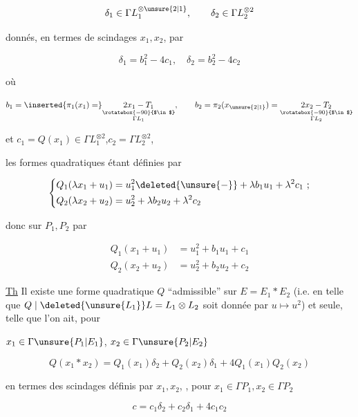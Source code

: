 

\[ \delta_1\in\Gamma L_1^{\otimes\unsure{2|1}},\qquad\delta_2\in\Gamma L_{2}^{\otimes2} \]

donnés, en termes de scindages  $x_1,x_2$, par

\[ \delta_1=b_1^2-4c_1,\quad\delta_2=b_2^2-4c_2 \]

où

\[ b_1=\inserted{\pi_1(x_1)=}\underset{\substack{\rotatebox{-90}{$\in$}\\\Gamma L_1}}{2x_1-T_1},\qquad b_2=\pi_2(x_{\unsure{2|1}})=\underset{\substack{\rotatebox{-90}{$\in$}\\\Gamma L_2}}{2x_2-T_2} \]

et \quad $c_1=Q(x_1)\in\Gamma L_1^{\otimes2}$,\quad $c_2=\Gamma L_2^{\otimes2}$,

les formes quadratiques  étant définies par

\[ \left\{\begin{aligned}Q_1(\lambda x_1+u_1)&=u_1^2\deleted{\unsure{-}}+\lambda b_1 u_1+\lambda^2 c_1\ ;\\ Q_2(\lambda x_2+u_2)&=u_2^2+\lambda b_2 u_2+\lambda^2c_2\end{aligned}\right. \]

donc sur $P_1,P_2$ par

\[ \begin{aligned}Q_1(x_1+u_1)&=u_1^2+b_1u_1+c_1\\Q_2(x_2+u_2)&=u_2^2+b_2u_2+c_2\end{aligned} \]

\uline{Th} Il existe une forme quadratique $Q$ ``admissible'' sur $E=E_1*E_2$  (i.e. en telle que $Q\mid\deleted{\unsure{L_1}} L=L_1\otimes L_2$  soit donnée par $u\longmapsto u^2$) et  seule, telle que l'on ait, pour

$x_1\in\Gamma \unsure{P_1|E_1}$, $x_2\in\Gamma \unsure{P_2|E_2}$ 

\[ \boxed{Q(x_1*x_2)=Q_1(x_1)\delta_2+Q_2(x_2)\delta_1+4Q_1(x_1)Q_2(x_2)} \]


en termes des scindages définis par $x_1,x_2$, , pour $x_1\in\Gamma P_1,x_2\in\Gamma P_2$

\[ \boxed{c=c_1\delta_2+c_2\delta_1+4c_1c_2} \]
